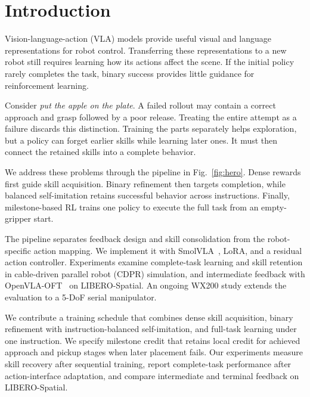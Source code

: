 \section{Introduction}\label{sec:introduction}
Vision-language-action (VLA) models provide useful visual and language representations for robot control. Transferring these representations to a new robot still requires learning how its actions affect the scene. If the initial policy rarely completes the task, binary success provides little guidance for reinforcement learning.

Consider \emph{put the apple on the plate}. A failed rollout may contain a correct approach and grasp followed by a poor release. Treating the entire attempt as a failure discards this distinction. Training the parts separately helps exploration, but a policy can forget earlier skills while learning later ones. It must then connect the retained skills into a complete behavior.

We address these problems through the pipeline in Fig.~\ref{fig:hero}. Dense rewards first guide skill acquisition. Binary refinement then targets completion, while balanced self-imitation retains successful behavior across instructions. Finally, milestone-based RL trains one policy to execute the full task from an empty-gripper start.

The pipeline separates feedback design and skill consolidation from the robot-specific action mapping. We implement it with SmolVLA~\cite{smolvla}, LoRA, and a residual action controller. Experiments examine complete-task learning and skill retention in cable-driven parallel robot (CDPR) simulation, and intermediate feedback with OpenVLA-OFT~\cite{openvlaoft} on LIBERO-Spatial. An ongoing WX200 study extends the evaluation to a 5-DoF serial manipulator.

We contribute a training schedule that combines dense skill acquisition, binary refinement with instruction-balanced self-imitation, and full-task learning under one instruction. We specify milestone credit that retains local credit for achieved approach and pickup stages when later placement fails. Our experiments measure skill recovery after sequential training, report complete-task performance after action-interface adaptation, and compare intermediate and terminal feedback on LIBERO-Spatial.
